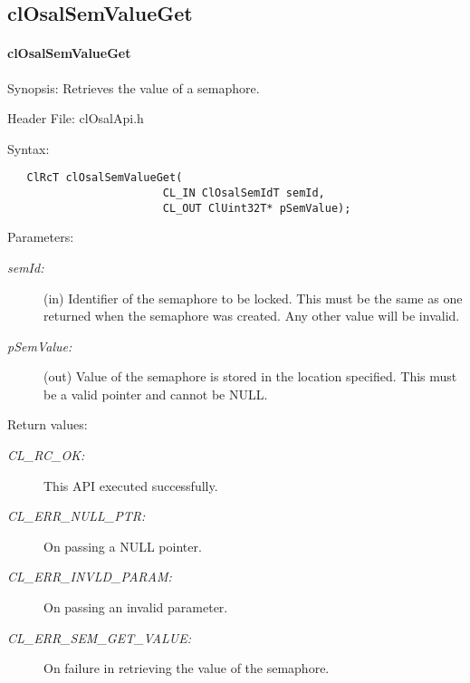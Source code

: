 \subsection{clOsalSemValueGet}
\hypertarget{pageosal137}{}\paragraph{cl\-Osal\-Sem\-Value\-Get}\label{pageosal137}
\begin{Desc}
\item[Synopsis:]Retrieves the value of a semaphore.\end{Desc}
\begin{Desc}
\item[Header File:]clOsalApi.h\end{Desc}
\begin{Desc}
\item[Syntax:]

\footnotesize\begin{verbatim}   ClRcT clOsalSemValueGet(
                        CL_IN ClOsalSemIdT semId,
                        CL_OUT ClUint32T* pSemValue);
\end{verbatim}
\normalsize
\end{Desc}
\begin{Desc}
\item[Parameters:]
\begin{description}
\item[{\em sem\-Id:}](in) Identifier of the semaphore to be locked. This must be the same as one returned when the semaphore was created. Any other value 
will be invalid.\item[{\em p\-Sem\-Value:}](out) Value of the semaphore is stored in the location specified. This must be a valid pointer and cannot be NULL.\end{description}
\end{Desc}
\begin{Desc}
\item[Return values:]
\begin{description}
\item[{\em CL\_\-RC\_\-OK:}]This API executed successfully. \item[{\em CL\_\-ERR\_\-NULL\_\-PTR:}]On passing a NULL pointer. \item[{\em CL\_\-ERR\_\-INVLD\_\-PARAM:}]On passing an invalid parameter. \item[{\em CL\_\-ERR\_\-SEM\_\-GET\_\-VALUE:}]On failure in retrieving the value of the semaphore.\end{description}
\end{Desc}
